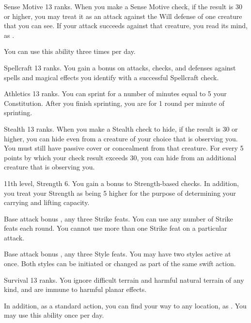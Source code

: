 \featpre Sense Motive 13 ranks.
\featben When you make a Sense Motive check, if the result is 30 or higher, you may treat it as an attack against the Will defense of one creature that you can see. If your attack succeeds against that creature, you read its mind, as .

You can use this ability three times per day.

\featpre Spellcraft 13 ranks.
\featben You gain a  bonus on attacks, checks, and defenses against spells and magical effects you identify with a successful Spellcraft check.

\featpre Athletics 13 ranks.
\featben You can sprint for a number of minutes equal to 5 \add your Constitution. After you finish sprinting, you are \fatigued for 1 round per minute of sprinting.

\featpre Stealth 13 ranks.
\featben When you make a Stealth check to hide, if the result is 30 or higher, you can hide even from a creature of your choice that is observing you. You must still have passive cover or concealment from that creature. For every 5 points by which your check result exceeds 30, you can hide from an additional creature that is observing you.

\featpre 11th level, Strength 6.
\featben You gain a  bonus to Strength-based checks. In addition, you treat your Strength as being 5 higher for the purpose of determining your carrying and lifting capacity.

\featpre Base attack bonus , any three Strike feats.
\featben You can use any number of Strike feats each round. You cannot use more than one Strike feat on a particular attack.

\featpre Base attack bonus , any three Style feats.
\featben You may have two styles active at once. Both styles can be initiated or changed as part of the same swift action.

\featpre Survival 13 ranks.
\featben You ignore difficult terrain and harmful natural terrain of any kind, and are immune to harmful planar effects.

In addition, as a standard action, you can find your way to any location, as . You may use this ability once per day.

